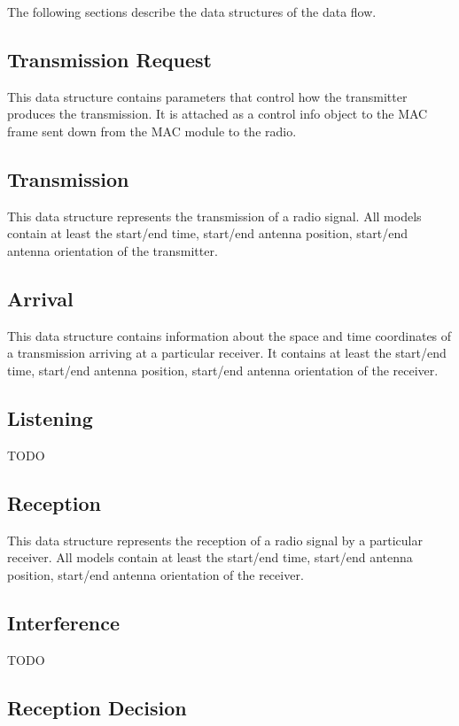 The following sections describe the data structures of the data flow.

\subsection{Transmission Request}

This data structure contains parameters that control how the transmitter produces
the transmission. It is attached as a control info object to the MAC frame sent
down from the MAC module to the radio.

\subsection{Transmission}

This data structure represents the transmission of a radio signal. All models
contain at least the start/end time, start/end antenna position, start/end antenna
orientation of the transmitter.

\subsection{Arrival}

This data structure contains information about the space and time coordinates of
a transmission arriving at a particular receiver. It contains at least the 
start/end time, start/end antenna position, start/end antenna orientation of the
receiver. 

\subsection{Listening}

TODO

\subsection{Reception}

This data structure represents the reception of a radio signal by a particular
receiver. All models contain at least the start/end time, start/end antenna position,
start/end antenna orientation of the receiver. 

\subsection{Interference}

TODO

\subsection{Reception Decision}

